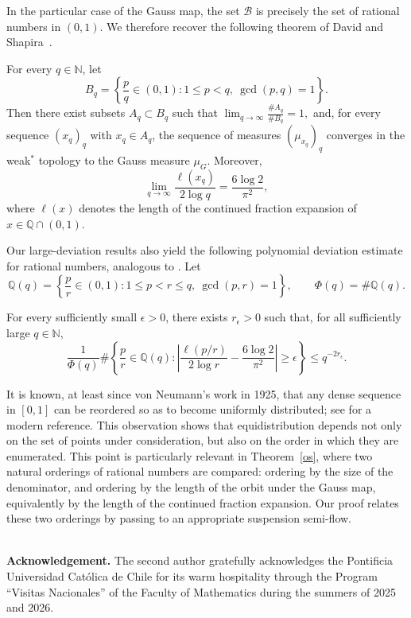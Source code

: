 \documentclass[letterpaper,11pt]{amsart}
\numberwithin{equation}{section}     %
\def\Q{{\mathbb Q}}
\begin{document}
In the particular case of the Gauss map, the set $\mathcal B$ is precisely the set of rational numbers in $(0,1)$. We therefore recover the following theorem of David and Shapira~\cite[Theorem~1.1(2)]{ds}.

\begin{theorem}\label{os}
For every $q\in\mathbb N$, let
\[
B_q=
\left\{
\frac{p}{q}\in(0,1):
1\leq p<q,\ \gcd(p,q)=1
\right\}.
\]
Then there exist subsets $A_q\subset B_q$ such that $\lim_{q\to\infty}\frac{\#A_q}{\#B_q}=1,$ 
and, for every sequence $(x_q)_q$ with $x_q\in A_q$, the sequence of measures $(\mu_{x_q})_q$ converges in the weak$^\ast$ topology to the Gauss measure $\mu_G$. Moreover,
\[
\lim_{q\to\infty}
\frac{\ell(x_q)}{2\log q}
=
\frac{6\log 2}{\pi^2},
\]
where $\ell(x)$ denotes the length of the continued fraction expansion of $x\in\mathbb Q\cap(0,1)$.
\end{theorem}


Our large-deviation results also yield the following polynomial deviation estimate for rational numbers, analogous to \cite[Theorem~1.2(2)]{dtms}. Let
\[
\mathbb{Q}(q)=
\left\{
\frac{p}{r}\in(0,1):
1\leq p<r\leq q,\ \gcd(p,r)=1
\right\},
\qquad
\Phi(q)=\#\Q(q).
\]

\begin{theorem}\label{thm:prob}
For every sufficiently small $\epsilon>0$, there exists $r_\epsilon>0$ such that, for all sufficiently large $q\in\mathbb N$,
\[
\frac{1}{\Phi(q)}
\#
\left\{
\frac{p}{r}\in\Q(q):
\left|
\frac{\ell(p/r)}{2\log r}
-
\frac{6\log 2}{\pi^2}
\right|
\geq \epsilon
\right\}
\leq q^{-2r_\epsilon}.
\]
\end{theorem}

It is known, at least since von Neumann's work in 1925, that any dense sequence in $[0,1]$ can be reordered so as to become uniformly distributed; see \cite[Corollary~4.2]{kn} for a modern reference. This observation shows that equidistribution depends not only on the set of points under consideration, but also on the order in which they are enumerated. This point is particularly relevant in Theorem~\ref{os}, where two natural orderings of rational numbers are compared: ordering by the size of the denominator, and ordering by the length of the orbit under the Gauss map, equivalently by the length of the continued fraction expansion. Our proof relates these two orderings by passing to an appropriate suspension semi-flow.


\noindent\\
\textbf{Acknowledgement.} The second author gratefully acknowledges the Pontificia Universidad Cat\'olica de Chile for its warm hospitality through the Program ``Visitas Nacionales'' of the Faculty of Mathematics during the summers of 2025 and 2026.
\end{document}
